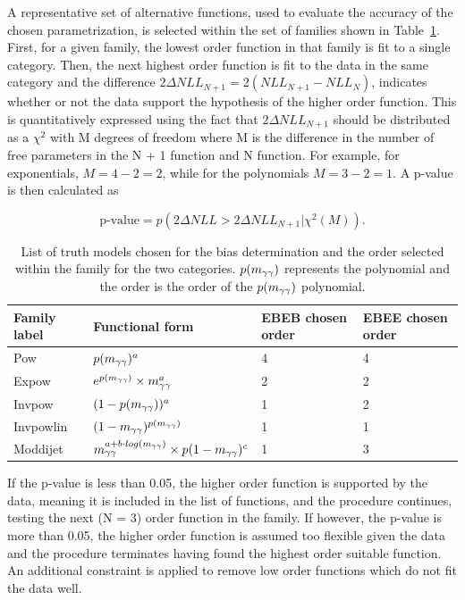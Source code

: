 A representative set of alternative functions, used to evaluate the accuracy of the chosen parametrization,
is selected within the set of families shown in Table~\ref{tab:bias_func}.
First, for a given family, the lowest order function in that family is fit to a single category. Then, the next highest order function is fit to the data in the same category and the difference $2 \Delta NLL_{N+1} = 2(NLL_{N+1} - NLL_{N})$, indicates whether or not the data support the hypothesis of the higher order function. This is quantitatively expressed using the fact that $ 2 \Delta NLL_{N+1}$ should be distributed as a $\chi^2$ with M degrees of freedom where M is the difference in the number of free parameters in the N + 1 function and N function. For example, for exponentials, $M = 4 - 2 = 2$, while for the polynomials $M = 3 - 2 = 1$. A p-value is then calculated as

$$ \text{p-value} = p(2 \Delta NLL > 2 \Delta NLL_{N+1}| \chi^2(M)). $$

\begin{table}[hbt]
\centering
\begin{tabular}{l|l||l|l}
    Family label & Functional form & EBEB chosen order & EBEE chosen order \\
    \hline
    Pow       &  $p(m_{\gamma\gamma})^a$                 &  4  &  4 \\
    Expow     &  $e^{p(m_{\gamma\gamma})}\times m_{\gamma\gamma}^a$  &  2  &  2 \\
    Invpow    &  $(1-p(m_{\gamma\gamma}))^a$             &  1  &  2 \\
    Invpowlin &  $(1-m_{\gamma\gamma})^{p(m_{\gamma\gamma})}$        &  1  &  1 \\
    Moddijet  &  $m_{\gamma\gamma}^{a+b\cdot log(m_{\gamma\gamma})} \times p(1-m_{\gamma\gamma})^c$ & 1 & 3 \\ 
\end{tabular}
\caption{
  List of truth models chosen for the bias determination and the order selected within the family for the two categories.
  $p(m_{\gamma\gamma})$ represents the polynomial and the order is the order of the $p(m_{\gamma\gamma})$ polynomial.
  \label{tab:bias_func}
}
\end{table}

If the p-value is less than 0.05, the higher order function is supported by the data, meaning it is included in the list of functions, and the procedure continues, testing the next (N = 3) order function in the family. If however, the p-value is more than 0.05, the higher order function is
assumed too flexible given the data and the procedure terminates having found the highest order suitable function. An additional constraint is applied to remove low order functions which do not fit the data well. %

